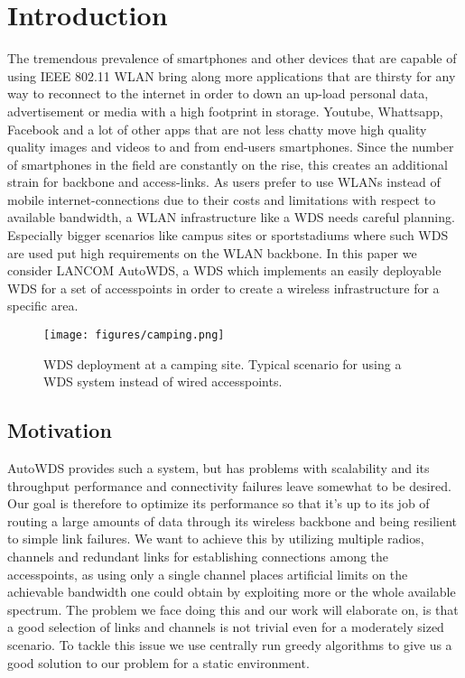 \chapter{Introduction}
  The tremendous prevalence of smartphones and other devices that are capable of using IEEE 802.11 WLAN bring along 
  more applications that are thirsty for any way to reconnect to the internet in order to 
  down an up-load personal data, advertisement or media with a high footprint in storage.
  Youtube, Whattsapp, Facebook and a lot of other apps that are not less chatty move high quality quality images and videos 
  to and from end-users smartphones. Since the number of smartphones in the field are constantly on the rise, this creates an additional strain for
  backbone and access-links. As users prefer to use WLANs instead of mobile internet-connections due to their costs and limitations with respect to available bandwidth,
  a WLAN infrastructure like a WDS needs careful planning. Especially bigger scenarios like campus sites or sportstadiums where such WDS are used put high requirements on the
  WLAN backbone. In this paper we consider LANCOM AutoWDS, 
  a WDS which implements an easily deployable \ac{WDS} for a set of accesspoints in order to create a wireless infrastructure for a specific area.

  \begin{figure}[h]
    \centering
    \texttt{[image: figures/camping.png]}
    \caption{WDS deployment at a camping site. Typical scenario for using a WDS system instead of wired accesspoints.}
    \label{fig:camping}
  \end{figure}
  
\section{Motivation}
  AutoWDS provides such a system, but has problems with scalability and its throughput performance and connectivity failures leave somewhat to be desired.
  Our goal is therefore to optimize its performance so that it's up to its job of routing a large amounts of data through its wireless backbone and being resilient to simple link
  failures. We want to achieve this by utilizing multiple radios, channels and redundant links for establishing connections among the accesspoints, as using only a single
  channel places artificial limits on the achievable bandwidth one could obtain by exploiting more or the whole available spectrum.
  The problem we face doing this and our work will elaborate on, is that a good selection of links and channels is not trivial even for a moderately sized scenario.
  To tackle this issue we use centrally run greedy algorithms to give us a good solution to our problem for a static environment.
  

